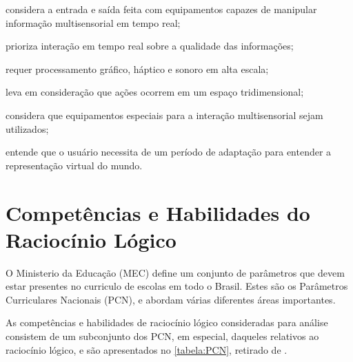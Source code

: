 \begin{alineas}
	\item considera a entrada e saída feita com equipamentos capazes de manipular 
	informação multisensorial em tempo real;
	\item prioriza interação em tempo real sobre a qualidade das informações;
	\item requer processamento gráfico, háptico e sonoro em alta escala;
	\item leva em consideração que ações ocorrem em um espaço tridimensional;
	\item considera que equipamentos especiais para a interação multisensorial sejam
	utilizados;
	\item entende que o usuário necessita de um período de adaptação para entender a
	representação virtual do mundo.
\end{alineas}

\section{Competências e Habilidades do Raciocínio Lógico}\label{sec-competenciashabilidades}

O Ministerio da Educação (MEC) define um conjunto de parâmetros que devem estar
presentes no curriculo de escolas em todo o Brasil. Estes são os Parâmetros
Curriculares Nacionais (PCN), e abordam várias diferentes áreas importantes. 

As competências e habilidades de raciocínio lógico consideradas para análise
consistem de um subconjunto dos PCN, em especial, daqueles relativos ao 
raciocínio lógico, e são apresentados no \autoref{tabela:PCN}, retirado de
\cite{Tabuti:2015:tabela_habilidades}.


